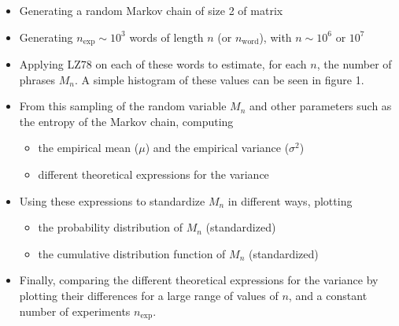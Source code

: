 \begin{itemize}

	\item Generating a random Markov chain of size 2 of matrix
 \item
 Generating $n_{\text{exp}} \sim 10^3$ words of length $n $ (or $n_{\text{word}}$), with $n \sim 10^6 \text{ or } 10^7$
 
 \item Applying LZ78 on each of these words to estimate, for each $n$,
 the number of phrases $M_n$. A simple histogram of these values
 can be seen in figure 1.
 
 \item From this sampling of the random variable $M_n$ and other parameters such as the entropy of the Markov chain, computing
 
 	\begin{itemize}
 		\item the empirical mean ($\mu$) and the empirical variance ($\sigma^2$)
 		\item different theoretical expressions for the variance
 	\end{itemize}
 	
 \item Using these expressions to standardize $M_n$ in different ways, plotting
 
 	\begin{itemize}
 		\item the probability distribution of $M_n$ (standardized)
 			  
 		\item the cumulative distribution function of $M_n$ (standardized)
 	\end{itemize}
 
 \item Finally, comparing the different theoretical expressions for the variance 
 by plotting their differences for a large range of values of $n$, and
 a constant number of experiments $n_{\text{exp}}$.
\end{itemize}
 
 
